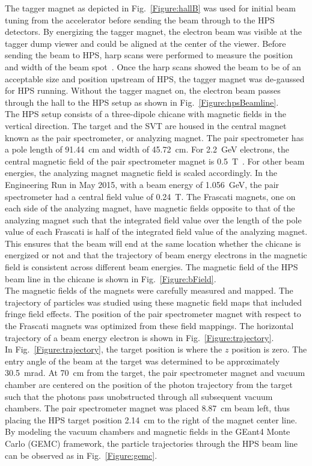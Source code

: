 The tagger magnet as depicted in Fig.~\ref{Figure:hallB} was used for initial beam tuning from the accelerator before sending the beam through to the HPS detectors. By energizing the tagger magnet, the electron beam was visible at the tagger dump viewer and could be aligned at the center of the viewer. Before sending the beam to HPS, harp scans were performed to measure the position and width of the beam spot~\cite{beamline_nim_2017}. Once the harp scans showed the beam to be of an acceptable size and position upstream of HPS, the tagger magnet was de-gaussed for HPS running. Without the tagger magnet on, the electron beam passes through the hall to the HPS setup as shown in Fig.~\ref{Figure:hpsBeamline}. \\
\indent The HPS setup consists of a three-dipole chicane with magnetic fields in the vertical direction. The target and the SVT are housed in the central magnet known as the pair spectrometer, or analyzing magnet. The pair spectrometer has a pole length of 91.44~cm and width of 45.72~cm. For 2.2~GeV electrons, the central magnetic field of the pair spectrometer magnet is 0.5~T~\cite{beamline_nim_2017}. For other beam energies, the analyzing magnet magnetic field is scaled accordingly. In the Engineering Run in May 2015, with a beam energy of 1.056~GeV, the pair spectrometer had a central field value of 0.24~T. The Frascati magnets, one on each side of the analyzing magnet, have magnetic fields opposite to that of the analyzing magnet such that the integrated field value over the length of the pole value of each Frascati is half of the integrated field value of the analyzing magnet. This ensures that the beam will end at the same location whether the chicane is energized or not and that the trajectory of beam energy electrons in the magnetic field is consistent across different beam energies. The magnetic field of the HPS beam line in the chicane is shown in Fig.~\ref{Figure:bField}.\\
\indent The magnetic fields of the magnets were carefully measured and mapped. The trajectory of particles was studied using these magnetic field maps that included fringe field effects. The position of the pair spectrometer magnet with respect to the Frascati magnets was optimized from these field mappings. The horizontal trajectory of a beam energy electron is shown in Fig.~\ref{Figure:trajectory}.\\
\indent In Fig.~\ref{Figure:trajectory}, the target position is where the $z$ position is zero. The entry angle of the beam at the target was determined to be approximately 30.5~mrad. At 70~cm from the target, the pair spectrometer magnet and vacuum chamber are centered on the position of the photon trajectory from the target such that the photons pass unobstructed through all subsequent vacuum chambers. The pair spectrometer magnet was placed 8.87~cm beam left, thus placing the HPS target position 2.14~cm to the right of the magnet center line. By modeling the vacuum chambers and magnetic fields in the GEant4 Monte Carlo (GEMC) framework, the particle trajectories through the HPS beam line can be observed as in Fig.~\ref{Figure:gemc}.\\
